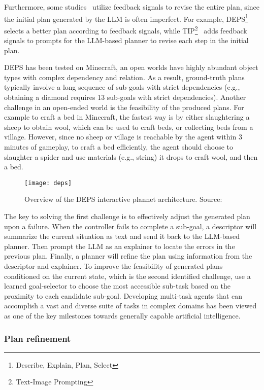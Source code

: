 Furthermore, some studies~\cite{hao2022structured, wang2023describeexplainplanselect} utilize feedback signals to revise the entire plan, since the initial plan generated by the LLM is often imperfect.
For example, DEPS\footnote{Describe, Explain, Plan, Select}~\cite{wang2023describeexplainplanselect} selects a better plan according to feedback signals, while TIP\footnote{Text-Image Prompting}~\cite{lu2023multimodal} adds feedback signals to prompts for the LLM-based planner to revise each step in the initial plan.

DEPS has been tested on Minecraft, an open worlds have highly abundant object types with complex dependency and relation.
As a result, ground-truth plans typically involve a long sequence of sub-goals with strict dependencies (e.g., obtaining a diamond requires 13 sub-goals with strict dependencies).
Another challenge in an open-ended world is the feasibility of the produced plans.
For example to craft a bed in Minecraft, the fastest way is by either slaughtering a sheep to obtain wool, which can be used to craft beds, or collecting beds from a village.
However, since no sheep or village is reachable by the agent within 3 minutes of gameplay, to craft a bed efficiently, the agent should choose to slaughter a spider and use materials (e.g., string) it drops to craft wool, and then a bed.
\begin{figure}[h!]
	\centering
	\texttt{[image: deps]}
	\caption{Overview of the DEPS interactive plannet architecture. Source: \textcite{wang2023describeexplainplanselect}}
	\label{fig:deps}
\end{figure}
The key to solving the first challenge is to effectively adjust the generated plan upon a failure.
When the controller fails to complete a sub-goal, a descriptor will summarize the current situation as text and send it back to the LLM-based planner.
Then prompt the LLM as an explainer to locate the errors in the previous plan.
Finally, a planner will refine the plan using information from the descriptor and explainer.
To improve the feasibility of generated plans conditioned on the current state, which is the second identified challenge, \textcite{wang2023describeexplainplanselect} use a learned goal-selector to choose the most accessible sub-task based on the proximity to each candidate sub-goal.
Developing multi-task agents that can accomplish a vast and diverse suite of tasks in complex domains has been viewed as one of the key milestones towards generally capable artificial intelligence.


\subsubsection{Plan refinement}
\label{subsubsec:plan-refinement}
\lipsum[1]

